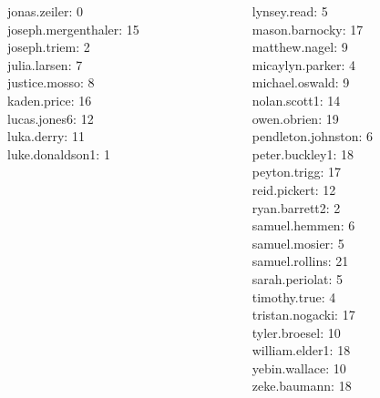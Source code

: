 \documentclass[10pt]{beamer}
\begin{document}
\begin{frame}
\begin{columns}
\begin{column}{0.33\textwidth}
jonas.zeiler: 0 \\ 
joseph.mergenthaler: 15 \\ 
joseph.triem: 2 \\ 
julia.larsen: 7 \\ 
justice.mosso: 8 \\ 
kaden.price: 16 \\ 
lucas.jones6: 12 \\ 
luka.derry: 11 \\ 
luke.donaldson1: 1 \\\end{column}
\begin{column}{0.33\textwidth}
lynsey.read: 5 \\ 
mason.barnocky: 17 \\ 
matthew.nagel: 9 \\ 
micaylyn.parker: 4 \\ 
michael.oswald: 9 \\ 
nolan.scott1: 14 \\ 
owen.obrien: 19 \\ 
pendleton.johnston: 6 \\ 
peter.buckley1: 18 \\ 
peyton.trigg: 17 \\ 
reid.pickert: 12 \\ 
ryan.barrett2: 2 \\ 
samuel.hemmen: 6 \\ 
samuel.mosier: 5 \\ 
samuel.rollins: 21 \\ 
sarah.periolat: 5 \\ 
timothy.true: 4 \\ 
tristan.nogacki: 17 \\ 
tyler.broesel: 10 \\ 
william.elder1: 18 \\ 
yebin.wallace: 10 \\ 
zeke.baumann: 18 \\\end{column}
\end{columns}
	
\end{frame}
\end{document}
